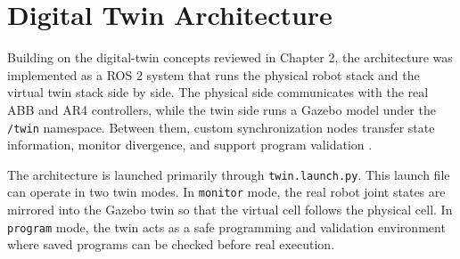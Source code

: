\section{Digital Twin Architecture}

Building on the digital-twin concepts reviewed in Chapter 2, the architecture was implemented as a ROS 2 system that runs the physical robot stack and the virtual twin stack side by side. The physical side communicates with the real ABB and AR4 controllers, while the twin side runs a Gazebo model under the \texttt{/twin} namespace. Between them, custom synchronization nodes transfer state information, monitor divergence, and support program validation \cite{macenski2022robot,wang2020digital}.

The architecture is launched primarily through \texttt{twin.launch.py}. This launch file can operate in two twin modes. In \texttt{monitor} mode, the real robot joint states are mirrored into the Gazebo twin so that the virtual cell follows the physical cell. In \texttt{program} mode, the twin acts as a safe programming and validation environment where saved programs can be checked before real execution.

